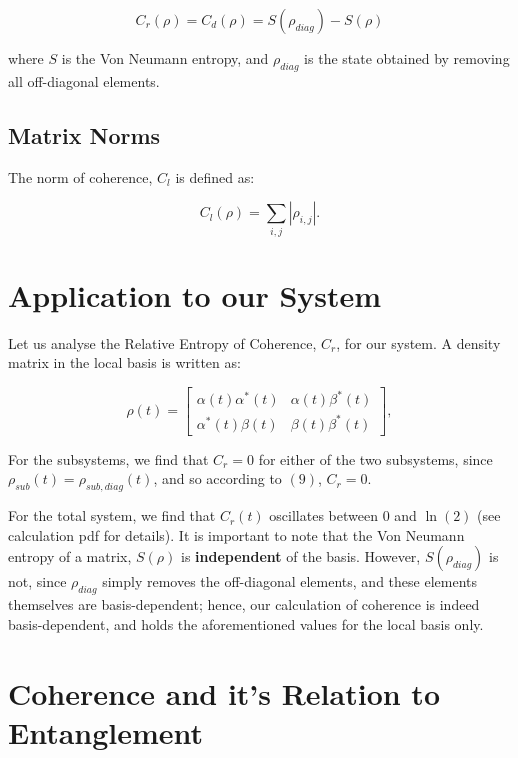 \documentclass[12pt]{article}
\begin{document}
\begin{equation}
C_r(\rho) = C_d(\rho) = S(\rho_{diag}) - S(\rho)
\end{equation}

where $S$ is the Von Neumann entropy, and $\rho_{diag}$ is the state obtained by removing all off-diagonal elements. 

\subsection{Matrix Norms}

The norm of coherence, $C_l$ is defined as:

\begin{equation}
    C_l(\rho) = \sum_{i,j}|\rho_{i,j}|.
\end{equation}

\section{Application to our System}

Let us analyse the Relative Entropy of Coherence, $C_r$, for our system. A density matrix in the local basis is written as:

\begin{equation}
    \rho(t) = \begin{bmatrix}
        \alpha(t)\alpha^*(t) & \alpha(t)\beta^*(t) \\
        \alpha^*(t)\beta(t) & \beta(t)\beta^*(t)
    \end{bmatrix},
\end{equation}

For the subsystems, we find that $C_r = 0$ for either of the two subsystems, since $\rho_{sub}(t) = \rho_{sub,diag}(t)$, and so according to $(9)$, $C_r = 0$.

For the total system, we find that $C_r(t)$ oscillates between $0$ and $\ln(2)$ (see calculation pdf for details). It is important to note that the Von Neumann entropy of a matrix, $S(\rho)$ is \textbf{independent} of the basis. However, $S(\rho_{diag})$ is not, since $\rho_{diag}$ simply removes the off-diagonal elements, and these elements themselves are basis-dependent; hence, our calculation of coherence is indeed basis-dependent, and holds the aforementioned values for the local basis only. 

\section{Coherence and it's Relation to Entanglement}
\end{document}
